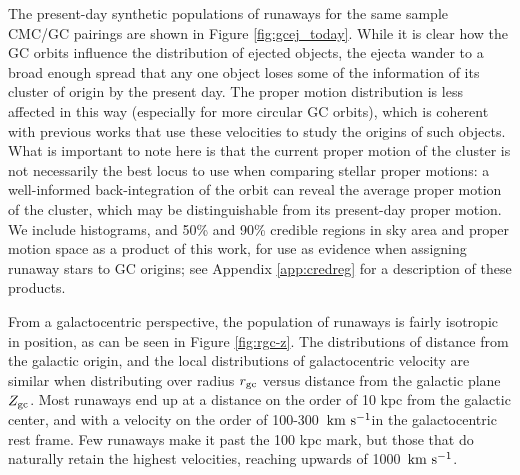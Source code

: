 \documentclass[twocolumn]{aastex631}
\newcommand{\kms}{${\rm km~s^{-1}}$}
\begin{document}
The present-day synthetic populations of runaways for the same sample CMC/GC pairings are shown in Figure \ref{fig:gcej_today}.
While it is clear how the GC orbits influence the distribution of ejected objects, the ejecta wander to a broad enough spread that any one object loses some of the information of its cluster of origin by the present day.
The proper motion distribution is less affected in this way (especially for more circular GC orbits), which is coherent with previous works that use these velocities to study the origins of such objects.
What is important to note here is that the current proper motion of the cluster is not necessarily the best locus to use when comparing stellar proper motions: a well-informed back-integration of the orbit can reveal the average proper motion of the cluster, which may be distinguishable from its present-day proper motion.
We include histograms, and 50\% and 90\% credible regions in sky area and proper motion space as a product of this work, for use as evidence when assigning runaway stars to GC origins; see Appendix \ref{app:credreg} for a description of these products.

\begin{figure*}
    \caption{
        Present-day positions (galactic longitude/latitude) and velocities (projected onto the galactic longitude/latitude directions) for the runaway objects from the sample GCs.
        The color scale is the same as in Figure \ref{fig:gc_orbit_ejections}, depicting the eject masses.
        The back-integrated orbits are shown as the gray trajectories, and the blue "x" is the position/velocity of the GC as measured by \citet{2018MNRAS.478.1520B}.
        The set of synthetic ejecta shown here is the result of downsampling the total set by a factor of ten, to account for the repeated-realizations method described in \S\ref{sec:methods}. 
    }
    \label{fig:gcej_today}
\end{figure*}

From a galactocentric perspective, the population of runaways is fairly isotropic in position, as can be seen in Figure \ref{fig:rgc-z}.
The distributions of distance from the galactic origin, and the local distributions of galactocentric velocity are similar when distributing over radius $r_{\rm gc}$ versus distance from the galactic plane $Z_{\rm gc}$.
Most runaways end up at a distance on the order of 10 kpc from the galactic center, and with a velocity on the order of 100-300~\kms in the galactocentric rest frame.
Few runaways make it past the 100 kpc mark, but those that do naturally retain the highest velocities, reaching upwards of 1000~\kms.
\end{document}
